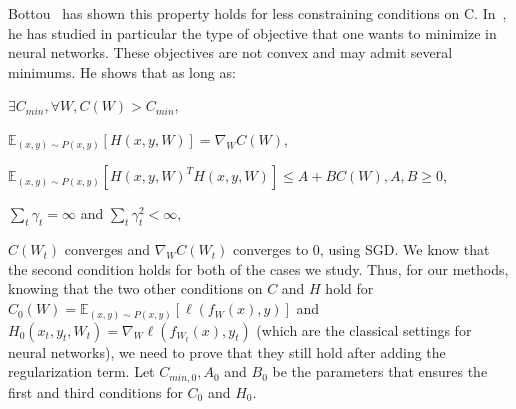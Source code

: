 \documentclass{article}
\begin{document}
Bottou~\cite{bottou1998online, bottou2010large, bottou2012stochastic} has shown this property holds for less constraining conditions on C. In~\cite{bottou1991stochastic}, he has studied in particular the type of objective that one wants to minimize in neural networks. These objectives are not convex and may admit several minimums. He shows that as long as: 
\begin{inparaenum}[(i)]
\item $\exists C_{min}, \forall W, C(W)>C_{min}$,
\item $\mathbb{E}_{(x,y)\sim P(x,y)}[H(x,y,W)] = \nabla_WC(W)$,
\item $\mathbb{E}_{(x,y)\sim P(x,y)}[H(x,y,W)^TH(x,y,W)] \le A + BC(W), A,B \geq 0$,
\item $\sum_t \gamma_t = \infty$ and $\sum_t \gamma_t^2 < \infty,$
\end{inparaenum}
$C(W_t)$ converges and $\nabla_WC(W_t)$ converges to 0, using SGD.  We know that the second condition holds for both of the cases we study. Thus, for our methods, knowing that the two other conditions on $C$ and $H$ hold for $C_0(W) = \mathbb{E}_{(x,y) \sim P(x,y)}[\ell(f_W(x),y)]$ and $H_0(x_t,y_t,W_t) = \nabla_W\ell(f_{W_t}(x),y_t)$ (which are the classical settings for neural networks), we need to prove that they still hold after adding the regularization term. Let $C_{min,0}, A_0$ and $B_0$ be the parameters that ensures the first and third conditions for $C_0$ and $H_0$.
\end{document}
